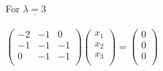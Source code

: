 \documentclass[12pt]{exam}
\begin{document}
\begin{questions}
\begin{solution}
\begin{enumerate}
	For $\underline{\lambda = 3}$\\ \\
	$\begin{pmatrix}
	-2 & -1 & 0 \\
	-1 & -1 & -1 \\
	0 & -1  & -1 \\
	\end{pmatrix}\begin{pmatrix}
	x_1 \\
	x_2 \\
	x_3\\
	\end{pmatrix} = \begin{pmatrix}
	0 \\
	0 \\
	0\\
	\end{pmatrix} $
	

\end{enumerate}
\end{solution}
\end{questions}
\end{document}
